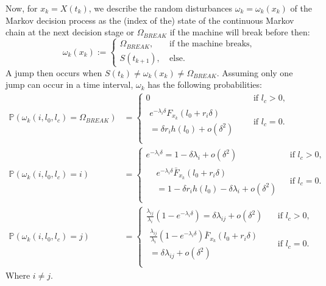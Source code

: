 \documentclass[a4paper]{thesis}
\theoremstyle{definition}
\begin{document}
Now, for $x_k=X(t_k)$, we describe the random disturbances $\omega_k=\omega_k(x_k)$ of the Markov decision process as the (index of the) state of the continuous Markov chain at the next decision stage or $\Omega_{BREAK}$ if the machine will break before then:
\[
\omega_k(x_k):=\begin{cases}
\Omega_{BREAK},&\ \text{if the machine breaks,}\\
S(t_{k+1}),&\ \text{else.}
\end{cases}
\]
A jump then occurs when $S(t_k)\neq\omega_k(x_k)\neq\Omega_{BREAK}$.
Assuming only one jump can occur in a time interval, $\omega_k$ has the following probabilities:
\[
\begin{split}
\mathbb{P}(\omega_k(i,l_0,l_c)=\Omega_{BREAK})&=\begin{cases}
	0&\text{ if }l_c>0,\\
	\begin{split}
	e^{-\lambda_{i}\delta}F_{x_k}(l_0+r_i\delta)&\\
	=\delta r_ih(l_0)+o(\delta^2)&
	\end{split}&\text{ if }l_c=0.\\
\end{cases}\\
\mathbb{P}(\omega_k(i,l_0,l_c)=i)&=\begin{cases}
	e^{-\lambda_i \delta}=1-\delta\lambda_i+o(\delta^2)&\text{ if }l_c>0,\\
	\begin{split}
	&e^{-\lambda_i \delta} \bar{F}_{x_k}(l_0+r_i\delta)\\
	&=1-\delta r_ih(l_0)-\delta\lambda_i+o(\delta^2)
	\end{split}&\text{ if }l_c=0.\\
\end{cases}\\
\mathbb{P}(\omega_k(i,l_0,l_c)=j)&=\begin{cases}
	\frac{\lambda_{ij}}{\lambda_i}(1-e^{-\lambda_i \delta})=\delta\lambda_{ij}+o(\delta^2) & \text{ if }l_c>0,\\
	\begin{split}
	\frac{\lambda_{ij}}{\lambda_i}(1-e^{-\lambda_i \delta})\bar{F}_{x_k}(l_0+r_i\delta)&\\
	=\delta\lambda_{ij}+o(\delta^2)&
	\end{split}&\text{ if }l_c=0.\\
\end{cases}
\end{split}
\]
Where $i\neq j$.
\end{document}
